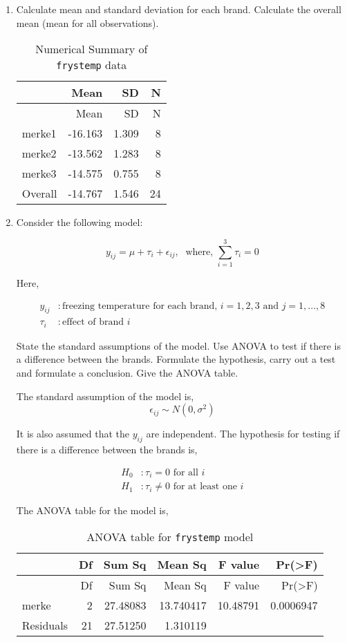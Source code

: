 \documentclass[11pt,a4paper]{article}
\begin{document}
\begin{enumerate}
\def\labelenumi{\alph{enumi})}
\item
  Calculate mean and standard deviation for each brand. Calculate the
  overall mean (mean for all observations).

  \begin{longtable}[c]{@{}lrrr@{}}
  \caption{Numerical Summary of \texttt{frystemp} data}\tabularnewline
  \toprule
  & Mean & SD & N\tabularnewline
  \midrule
  \endfirsthead
  \toprule
  & Mean & SD & N\tabularnewline
  \midrule
  \endhead
  merke1 & -16.163 & 1.309 & 8\tabularnewline
  merke2 & -13.562 & 1.283 & 8\tabularnewline
  merke3 & -14.575 & 0.755 & 8\tabularnewline
  Overall & -14.767 & 1.546 & 24\tabularnewline
  \bottomrule
  \end{longtable}
\item
  Consider the following model:

  \[y_{ij} = \mu + \tau_i + \epsilon_{ij}, \; \text{ where, } \sum_{i = 1}^3\tau_i = 0\]

  Here,

  \[
  \begin{aligned}
  y_{ij} &: \text{freezing temperature for each brand, } i = 1, 2, 3 \text{ and } j = 1, \ldots, 8 \\
  \tau_i &: \text{effect of brand }i
  \end{aligned}
  \]

  State the standard assumptions of the model. Use ANOVA to test if
  there is a difference between the brands. Formulate the hypothesis,
  carry out a test and formulate a conclusion. Give the ANOVA table.

  The standard assumption of the model is,
  \[\epsilon_{ij} \sim N(0, \sigma^2)\]

  It is also assumed that the \(y_{ij}\) are independent. The hypothesis
  for testing if there is a difference between the brands is,

  \[
  \begin{aligned}
  H_0 &: \tau_i = 0 \text{ for all } i \\
  H_1 &: \tau_i \ne 0 \text{ for at least one } i
  \end{aligned}
  \]

  The ANOVA table for the model is,

  \begin{longtable}[c]{@{}lrrrrr@{}}
  \caption{ANOVA table for \texttt{frystemp} model}\tabularnewline
  \toprule
  & Df & Sum Sq & Mean Sq & F value & Pr(\textgreater{}F)\tabularnewline
  \midrule
  \endfirsthead
  \toprule
  & Df & Sum Sq & Mean Sq & F value & Pr(\textgreater{}F)\tabularnewline
  \midrule
  \endhead
  merke & 2 & 27.48083 & 13.740417 & 10.48791 & 0.0006947\tabularnewline
  Residuals & 21 & 27.51250 & 1.310119 & &\tabularnewline
  \bottomrule
  \end{longtable}


\end{enumerate}
\end{document}
